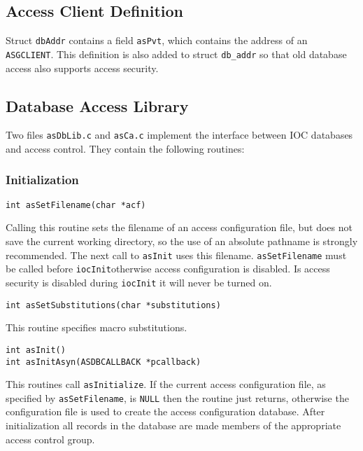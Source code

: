 \subsection{Access Client Definition}

Struct \verb|dbAddr| contains a field \verb|asPvt|, which contains the address of an \verb|ASGCLIENT|. This definition is also added to 
struct \verb|db_addr| so that old database access also supports access security. 

\subsection{Database Access Library}

Two files \verb|asDbLib.c| and \verb|asCa.c| implement the interface between IOC databases and access control. They contain the 
following routines:

\subsubsection{Initialization}

\begin{verbatim}
int asSetFilename(char *acf)
\end{verbatim}

Calling this routine sets the filename of an access configuration file, but does not save the current working directory, so 
the use of an absolute pathname is strongly recommended. The next call to \verb|asInit| uses this filename. 
\verb|asSetFilename| must be called before \verb|iocInit|otherwise access configuration is disabled. Is access security is 
disabled during \verb|iocInit| it will never be turned on.

\begin{verbatim}
int asSetSubstitutions(char *substitutions)
\end{verbatim}

This routine specifies macro substitutions.

\begin{verbatim}
int asInit()
int asInitAsyn(ASDBCALLBACK *pcallback)
\end{verbatim}

This routines call \verb|asInitialize|. If the current access configuration file, as specified by \verb|asSetFilename|, is \verb|NULL| 
then the routine just returns, otherwise the configuration file is used to create the access configuration database. After 
initialization all records in the database are made members of the appropriate access control group.

